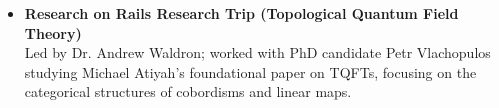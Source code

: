 \documentclass{curriculum-vitae}
\begin{document}
\begin{itemize}
\item \textbf{Research on Rails Research Trip (Topological Quantum Field Theory)} \\
    Led by Dr. Andrew Waldron; worked with PhD candidate Petr Vlachopulos studying Michael Atiyah's foundational paper on TQFTs, focusing on the categorical structures of cobordisms and linear maps.

    
\end{itemize}
\end{document}
